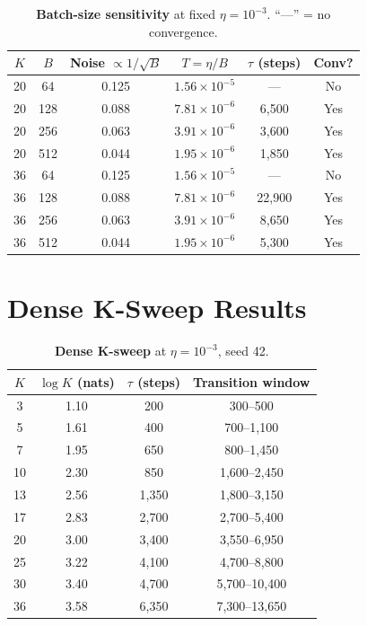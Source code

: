 \documentclass{article}
\begin{document}
\begin{table}[h]
\centering
\caption{\textbf{Batch-size sensitivity} at fixed $\eta = 10^{-3}$. ``---'' = no convergence.}
\label{tab:batch-size}
\vspace{4pt}
\small
\begin{tabular}{@{}cccccc@{}}
\toprule
$K$ & $B$ & Noise $\propto 1/\sqrt{B}$ & $T{=}\eta/B$ & $\tau$ (steps) & Conv? \\
\midrule
20 & 64  & 0.125 & $1.56 \times 10^{-5}$ & ---    & No \\
20 & 128 & 0.088 & $7.81 \times 10^{-6}$ & 6{,}500  & Yes \\
20 & 256 & 0.063 & $3.91 \times 10^{-6}$ & 3{,}600  & Yes \\
20 & 512 & 0.044 & $1.95 \times 10^{-6}$ & 1{,}850  & Yes \\
\midrule
36 & 64  & 0.125 & $1.56 \times 10^{-5}$ & ---    & No \\
36 & 128 & 0.088 & $7.81 \times 10^{-6}$ & 22{,}900 & Yes \\
36 & 256 & 0.063 & $3.91 \times 10^{-6}$ & 8{,}650  & Yes \\
36 & 512 & 0.044 & $1.95 \times 10^{-6}$ & 5{,}300  & Yes \\
\bottomrule
\end{tabular}
\end{table}

\section{Dense K-Sweep Results}
\label{app:ksweep}

\begin{table}[h]
\centering
\caption{\textbf{Dense K-sweep} at $\eta = 10^{-3}$, seed 42.}
\label{tab:ksweep}
\vspace{4pt}
\small
\begin{tabular}{@{}cccc@{}}
\toprule
$K$ & $\log K$ (nats) & $\tau$ (steps) & Transition window \\
\midrule
3  & 1.10 & 200  & 300--500 \\
5  & 1.61 & 400  & 700--1{,}100 \\
7  & 1.95 & 650  & 800--1{,}450 \\
10 & 2.30 & 850  & 1{,}600--2{,}450 \\
13 & 2.56 & 1{,}350 & 1{,}800--3{,}150 \\
17 & 2.83 & 2{,}700 & 2{,}700--5{,}400 \\
20 & 3.00 & 3{,}400 & 3{,}550--6{,}950 \\
25 & 3.22 & 4{,}100 & 4{,}700--8{,}800 \\
30 & 3.40 & 4{,}700 & 5{,}700--10{,}400 \\
36 & 3.58 & 6{,}350 & 7{,}300--13{,}650 \\
\bottomrule
\end{tabular}
\end{table}
\end{document}

